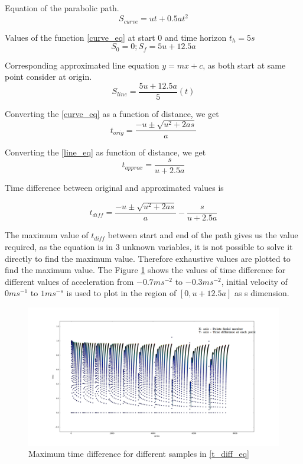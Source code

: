 Equation of the parabolic path. 
\begin{equation}
\label{curve_eq}
S_{curve} = ut + 0.5at^2
\end{equation}

Values of the function \ref{curve_eq} at start $0$ and time horizon $t_h = 5s$ 
\begin{equation}
S_0 = 0; S_f = 5u + 12.5a
\end{equation}

Corresponding approximated line equation $y=mx+c$, as both start at same point consider at origin. 
\begin{equation}
\label{line_eq}
S_{line} = \frac{5u+12.5a}{5}(t)
\end{equation}

Converting the \ref{curve_eq} as a function of distance, we get
\begin{equation}
t_{orig} = \frac{-u \pm \sqrt{u^2 + 2as}}{a}
\end{equation}

Converting the \ref{line_eq} as function of distance, we get
\begin{equation}
\label{line_eq}
t_{approx} = \frac{s}{u+2.5a}
\end{equation}

Time difference between original and approximated values is 

\begin{equation}
\label{t_diff_eq}
t_{diff} = \frac{-u \pm \sqrt{u^2 + 2as}}{a} - \frac{s}{u+2.5a}
\end{equation}

The maximum value of $t_{diff}$ between start and end of the path gives us the value required, as the equation is in 3 unknown variables, it is not possible to solve it directly to find the maximum value. Therefore exhaustive values are plotted to find the maximum value. The Figure \ref{time_diff_plot} shows the values of time difference for different values of acceleration from $-0.7ms^{-2}$ to $-0.3ms^{-2}$, initial velocity of $0ms^{-1}$ to $1ms^{-s}$ is used to plot in the region of $[0,u+12.5a]$ as s dimension. 


\begin{figure}[H]
	\centering
	\includegraphics[width=1.0\textwidth]{Images/appendix/time_diff.png}
	\caption{Maximum time difference for different samples in \ref{t_diff_eq}}
	\label{time_diff_plot}
\end{figure}

